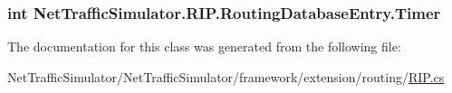 \hypertarget{classNetTrafficSimulator_1_1RIP_1_1RoutingDatabaseEntry_a19b3955d1a5855158bf0aa52a23643be}{
\subsubsection[{Timer}]{\setlength{\rightskip}{0pt plus 5cm}int Net\-Traffic\-Simulator.\-R\-I\-P.\-Routing\-Database\-Entry.\-Timer\hspace{0.3cm}{\ttfamily [get]}}}\label{classNetTrafficSimulator_1_1RIP_1_1RoutingDatabaseEntry_a19b3955d1a5855158bf0aa52a23643be}


The documentation for this class was generated from the following file\-:\begin{DoxyCompactItemize}
\item 
Net\-Traffic\-Simulator/\-Net\-Traffic\-Simulator/framework/extension/routing/\hyperlink{RIP_8cs}{R\-I\-P.\-cs}\end{DoxyCompactItemize}
